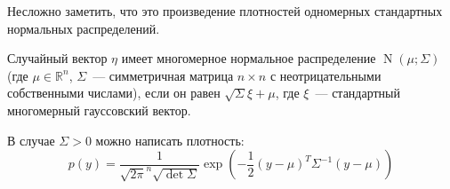\documentclass{article}
\begin{document}
    \begin{property}
        Несложно заметить, что это произведение плотностей одномерных стандартных нормальных распределений.
    \end{property}
    \begin{example}
        \label{N (многомерное)}
        Случайный вектор $\eta$ имеет многомерное нормальное распределение $\operatorname{N}(\mu;\Sigma)$ (где $\mu\in\mathbb R^n$, $\Sigma$~--- симметричная матрица $n\times n$ с неотрицательными собственными числами), если он равен $\sqrt\Sigma\xi+\mu$, где $\xi$~--- стандартный многомерный гауссовский вектор.
    \end{example}
    \begin{remark}
        В случае $\Sigma>0$ можно написать плотность:
        $$
        p(y)=\frac1{\sqrt{2\pi}^n\sqrt{\det\Sigma}}\exp\left(-\frac12(y-\mu)^T\Sigma^{-1}(y-\mu)\right)
        $$
    \end{remark}
\end{document}
